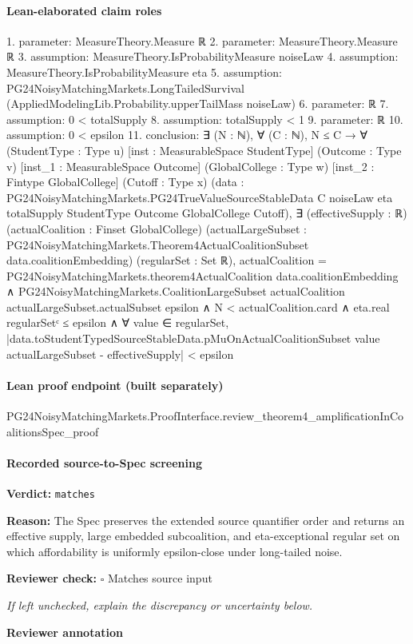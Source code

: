 \documentclass[10pt]{article}
\newcommand{\reviewerbox}{%
  \par\noindent\fbox{\parbox{0.96\linewidth}{\rule{0pt}{0.38in}}}\par
}
\newcommand{\reviewmatch}[1]{%
  \par\noindent\textbf{Reviewer check:} $\square$\; #1\par
  \noindent\emph{If left unchecked, explain the discrepancy or uncertainty below.}\par
}
\begin{document}
\paragraph{Lean-elaborated claim roles}\begin{ReviewVerbatim}
1. parameter: MeasureTheory.Measure ℝ
2. parameter: MeasureTheory.Measure ℝ
3. assumption: MeasureTheory.IsProbabilityMeasure noiseLaw
4. assumption: MeasureTheory.IsProbabilityMeasure eta
5. assumption: PG24NoisyMatchingMarkets.LongTailedSurvival (AppliedModelingLib.Probability.upperTailMass noiseLaw)
6. parameter: ℝ
7. assumption: 0 < totalSupply
8. assumption: totalSupply < 1
9. parameter: ℝ
10. assumption: 0 < epsilon
11. conclusion: ∃ (N : ℕ),
  ∀ (C : ℕ),
    N ≤ C →
      ∀ (StudentType : Type u) [inst : MeasurableSpace StudentType] (Outcome : Type v)
        [inst_1 : MeasurableSpace Outcome] (GlobalCollege : Type w) [inst_2 : Fintype GlobalCollege] (Cutoff : Type x)
        (data :
          PG24NoisyMatchingMarkets.PG24TrueValueSourceStableData C noiseLaw eta totalSupply StudentType Outcome
            GlobalCollege Cutoff),
        ∃ (effectiveSupply : ℝ) (actualCoalition : Finset GlobalCollege) (actualLargeSubset :
          PG24NoisyMatchingMarkets.Theorem4ActualCoalitionSubset data.coalitionEmbedding) (regularSet : Set ℝ),
          actualCoalition = PG24NoisyMatchingMarkets.theorem4ActualCoalition data.coalitionEmbedding ∧
            PG24NoisyMatchingMarkets.CoalitionLargeSubset actualCoalition actualLargeSubset.actualSubset epsilon ∧
              N < actualCoalition.card ∧
                eta.real regularSetᶜ ≤ epsilon ∧
                  ∀ value ∈ regularSet,
                    |data.toStudentTypedSourceStableData.pMuOnActualCoalitionSubset value actualLargeSubset -
                          effectiveSupply| <
                      epsilon
\end{ReviewVerbatim}

\paragraph{Lean proof endpoint (built separately)}\begin{ReviewVerbatim}
PG24NoisyMatchingMarkets.ProofInterface.review_theorem4_amplificationInCoalitionsSpec_proof
\end{ReviewVerbatim}

\paragraph{Recorded source-to-Spec screening}
\textbf{Verdict:} \texttt{matches}
\\
{\raggedright
\textbf{Reason:} The Spec preserves the extended source quantifier order and returns an effective supply, large embedded subcoalition, and eta-\allowbreak{}exceptional regular set on which affordability is uniformly epsilon-\allowbreak{}close under long-\allowbreak{}tailed noise.\allowbreak{}
\par}
\reviewmatch{Matches source input}
\noindent\textbf{Reviewer annotation}\par
\reviewerbox
\clearpage
\hypertarget{source-claim-68004cb711da81c5}{}
\end{document}
